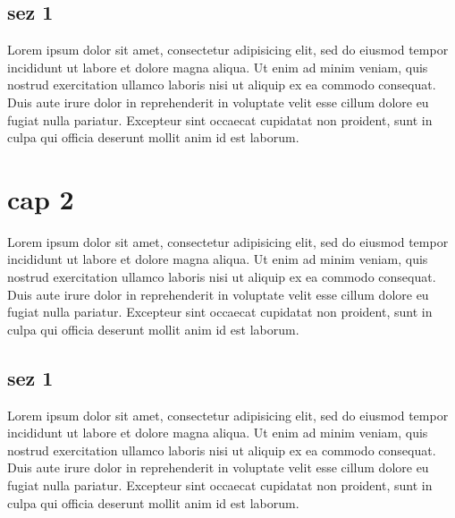 \documentclass[a4paper,10pt]{report} %
\begin{document}
    \subsection{sez 1}
      Lorem ipsum dolor sit amet, consectetur adipisicing elit, sed do eiusmod tempor incididunt ut labore et dolore magna aliqua. Ut enim ad minim veniam, quis nostrud exercitation ullamco laboris nisi ut aliquip ex ea commodo consequat. Duis aute irure dolor in reprehenderit in voluptate velit esse cillum dolore eu fugiat nulla pariatur. Excepteur sint occaecat cupidatat non proident, sunt in culpa qui officia deserunt mollit anim id est laborum.
  \section{cap 2}
    Lorem ipsum dolor sit amet, consectetur adipisicing elit, sed do eiusmod tempor incididunt ut labore et dolore magna aliqua. Ut enim ad minim veniam, quis nostrud exercitation ullamco laboris nisi ut aliquip ex ea commodo consequat. Duis aute irure dolor in reprehenderit in voluptate velit esse cillum dolore eu fugiat nulla pariatur. Excepteur sint occaecat cupidatat non proident, sunt in culpa qui officia deserunt mollit anim id est laborum.
    \subsection{sez 1}
      Lorem ipsum dolor sit amet, consectetur adipisicing elit, sed do eiusmod tempor incididunt ut labore et dolore magna aliqua. Ut enim ad minim veniam, quis nostrud exercitation ullamco laboris nisi ut aliquip ex ea commodo consequat. Duis aute irure dolor in reprehenderit in voluptate velit esse cillum dolore eu fugiat nulla pariatur. Excepteur sint occaecat cupidatat non proident, sunt in culpa qui officia deserunt mollit anim id est laborum.
\end{document}
